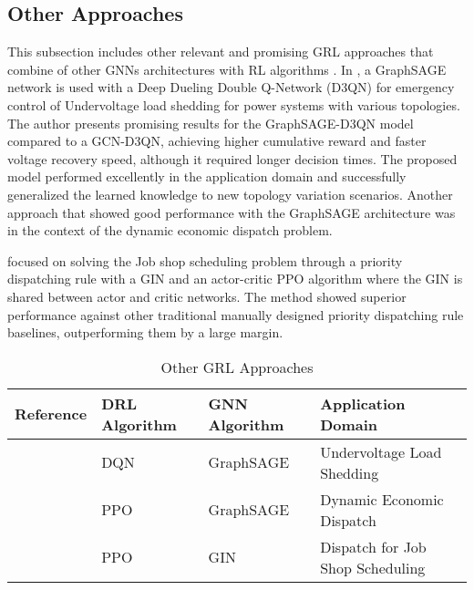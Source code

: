 \subsection{Other Approaches} \label{sec:review-other-gnn}

This subsection includes other relevant and promising \ac{GRL} approaches that combine of other \acp{GNN} architectures with \ac{RL} algorithms . In \cite{peiEmergencyControlStrategy2023}, a GraphSAGE network \cite{hamiltonInductiveRepresentationLearning2018} is used with a Deep Dueling Double Q-Network (D3QN) for emergency control of Undervoltage load shedding for power systems with various topologies. The author presents promising results for the GraphSAGE-D3QN model compared to a GCN-D3QN, achieving higher cumulative reward and faster voltage recovery speed, although it required longer decision times. The proposed model performed excellently in the application domain and successfully generalized the learned knowledge to new topology variation scenarios. Another approach that showed good performance with the GraphSAGE architecture was \cite{zhaoGraphbasedDeepReinforcement2022} in the context of the dynamic economic dispatch problem. \par
\cite{zhangLearningDispatchJob2020} focused on solving the Job shop scheduling problem through a priority dispatching rule with a \ac{GIN} \cite{xuHowPowerfulAre2019} and an actor-critic \ac{PPO} algorithm where the \ac{GIN} is shared between actor and critic networks. The method showed superior performance against other traditional manually designed priority dispatching rule baselines, outperforming them by a large margin.

\begin{table}[H] 
	\centering
	\caption{Other \acs{GRL} Approaches}
	\begin{tabular}{|P{2cm}|P{2cm}|P{2cm}|p{5cm}|  }
		\hline
		\textbf{Reference} & \textbf{DRL Algorithm} & \textbf{GNN Algorithm} & \textbf{Application Domain} \\
		\hline
		\cite{peiEmergencyControlStrategy2023} & DQN & GraphSAGE & Undervoltage Load Shedding  \\ \hline
		\cite{zhaoGraphbasedDeepReinforcement2022} & PPO & GraphSAGE  & Dynamic Economic Dispatch \\ \hline
		\cite{zhangLearningDispatchJob2020} & PPO & GIN & Dispatch for Job Shop Scheduling \\ \hline 
	\end{tabular}
	\label{tab:other-lit}
\end{table}

